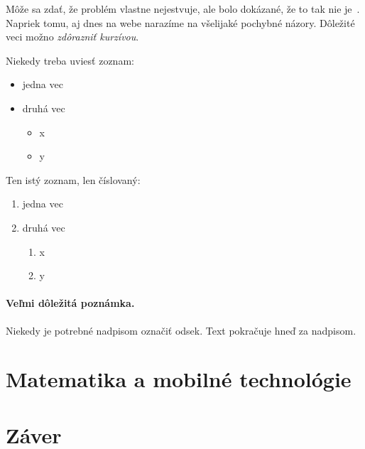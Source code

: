 \documentclass[10pt,twoside,slovak,a4paper]{article}
\begin{document}
Môže sa zdať, že problém vlastne nejestvuje\cite{Coplien:MPD}, ale bolo dokázané, že to tak nie je~\cite{Czarnecki:Staged, Czarnecki:Progress}. Napriek tomu, aj dnes na webe narazíme na všelijaké pochybné názory\cite{PLP-Framework}. Dôležité veci možno \emph{zdôrazniť kurzívou}.


Niekedy treba uviesť zoznam:

\begin{itemize}
\item jedna vec
\item druhá vec
	\begin{itemize}
	\item x
	\item y
	\end{itemize}
\end{itemize}

Ten istý zoznam, len číslovaný:

\begin{enumerate}
\item jedna vec
\item druhá vec
	\begin{enumerate}
	\item x
	\item y
	\end{enumerate}
\end{enumerate}


\paragraph{Veľmi dôležitá poznámka.}
Niekedy je potrebné nadpisom označiť odsek. Text pokračuje hneď za nadpisom.



\section{Matematika a mobilné technológie} \label{dolezita}


\section{Záver} \label{zaver} %






\end{document}
